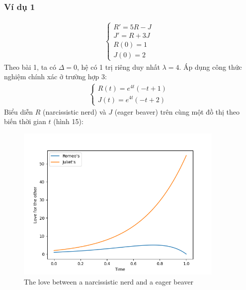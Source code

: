 \subsubsection{Ví dụ 1}
\begin{align*}
    \begin{cases}
        R'=5R-J\\
        J'=R+3J\\
        R(0)=1\\
        J(0)=2
    \end{cases}
\end{align*}
Theo bài 1, ta có $\Delta=0$, hệ có 1 trị riêng duy nhất $\lambda=4$. Áp dụng công thức nghiệm chính xác ở trường hợp 3:
\begin{align*}
    \begin{cases}
        R(t)=e^{4t}(-t+1)\\
        J(t)=e^{4t}(-t+2)
    \end{cases}
\end{align*}
Biểu diễn $R$ (narcissistic nerd) và $J$ (eager beaver) trên cùng một đồ thị theo biến thời gian $t$ (hình 15):
\begin{figure}[h!]
    \begin{center}
    \includegraphics[width=10cm]{images/narcissistic_nerd_1.png}
    \end{center}
    \caption{The love between a narcissistic nerd and a eager beaver}
\end{figure}
